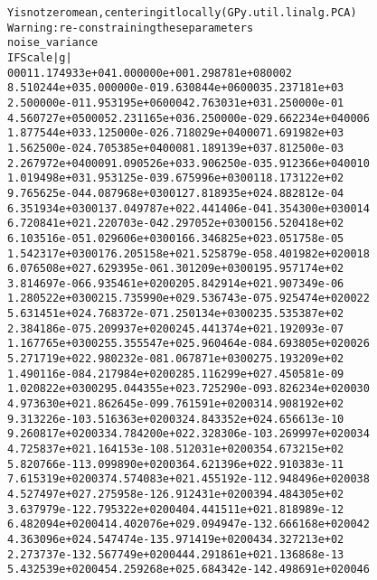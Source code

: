 \documentclass[letterpaper,10pt,english]{/usr/share/sphinx/texinputs/sphinxhowto}
\newenvironment{InvisibleVerbatim}
        {\begin{mdframed}[leftmargin=0.1\linewidth,innerleftmargin=3pt,innerrightmargin=3pt, userdefinedwidth=1\linewidth, linewidth=0pt, linecolor=white, usetwoside=false]}
        {\end{mdframed}}
\begin{document}
                \begin{InvisibleVerbatim}
                \vspace{-0.5\baselineskip}
\begin{alltt}Y is not zero mean, centering it locally (GPy.util.linalg.PCA)
Warning: re-constraining these parameters
noise\_variance
 I      F              Scale          |g|
 0001   1.174933e+04   1.000000e+00   1.298781e+08  0002
8.510244e+03   5.000000e-01   9.630844e+06  0003   5.237181e+03
2.500000e-01   1.953195e+06  0004   2.763031e+03   1.250000e-01
4.560727e+05  0005   2.231165e+03   6.250000e-02   9.662234e+04  0006
1.877544e+03   3.125000e-02   6.718029e+04  0007   1.691982e+03
1.562500e-02   4.705385e+04  0008   1.189139e+03   7.812500e-03
2.267972e+04  0009   1.090526e+03   3.906250e-03   5.912366e+04  0010
1.019498e+03   1.953125e-03   9.675996e+03  0011   8.173122e+02
9.765625e-04   4.087968e+03  0012   7.818935e+02   4.882812e-04
6.351934e+03  0013   7.049787e+02   2.441406e-04   1.354300e+03  0014
6.720841e+02   1.220703e-04   2.297052e+03  0015   6.520418e+02
6.103516e-05   1.029606e+03  0016   6.346825e+02   3.051758e-05
1.542317e+03  0017   6.205158e+02   1.525879e-05   8.401982e+02  0018
6.076508e+02   7.629395e-06   1.301209e+03  0019   5.957174e+02
3.814697e-06   6.935461e+02  0020   5.842914e+02   1.907349e-06
1.280522e+03  0021   5.735990e+02   9.536743e-07   5.925474e+02  0022
5.631451e+02   4.768372e-07   1.250134e+03  0023   5.535387e+02
2.384186e-07   5.209937e+02  0024   5.441374e+02   1.192093e-07
1.167765e+03  0025   5.355547e+02   5.960464e-08   4.693805e+02  0026
5.271719e+02   2.980232e-08   1.067871e+03  0027   5.193209e+02
1.490116e-08   4.217984e+02  0028   5.116299e+02   7.450581e-09
1.020822e+03  0029   5.044355e+02   3.725290e-09   3.826234e+02  0030
4.973630e+02   1.862645e-09   9.761591e+02  0031   4.908192e+02
9.313226e-10   3.516363e+02  0032   4.843352e+02   4.656613e-10
9.260817e+02  0033   4.784200e+02   2.328306e-10   3.269997e+02  0034
4.725837e+02   1.164153e-10   8.512031e+02  0035   4.673215e+02
5.820766e-11   3.099890e+02  0036   4.621396e+02   2.910383e-11
7.615319e+02  0037   4.574083e+02   1.455192e-11   2.948496e+02  0038
4.527497e+02   7.275958e-12   6.912431e+02  0039   4.484305e+02
3.637979e-12   2.795322e+02  0040   4.441511e+02   1.818989e-12
6.482094e+02  0041   4.402076e+02   9.094947e-13   2.666168e+02  0042
4.363096e+02   4.547474e-13   5.971419e+02  0043   4.327213e+02
2.273737e-13   2.567749e+02  0044   4.291861e+02   1.136868e-13
5.432539e+02  0045   4.259268e+02   5.684342e-14   2.498691e+02  0046

\end{alltt}
\end{InvisibleVerbatim}
\end{document}
